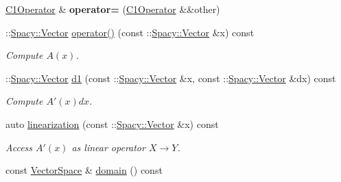 \begin{DoxyCompactItemize}
\item 
\hypertarget{classSpacy_1_1FEniCS_1_1C1Operator_ae611721c1f172413877c91a3e99ae69b}{}\hyperlink{classSpacy_1_1FEniCS_1_1C1Operator}{C1\+Operator} \& {\bfseries operator=} (\hyperlink{classSpacy_1_1FEniCS_1_1C1Operator}{C1\+Operator} \&\&other)\label{classSpacy_1_1FEniCS_1_1C1Operator_ae611721c1f172413877c91a3e99ae69b}

\item 
\hypertarget{classSpacy_1_1FEniCS_1_1C1Operator_a5e2b3831a7583793f6c134eedd2be9bc}{}\+::\hyperlink{classSpacy_1_1Vector}{Spacy\+::\+Vector} \hyperlink{classSpacy_1_1FEniCS_1_1C1Operator_a5e2b3831a7583793f6c134eedd2be9bc}{operator()} (const \+::\hyperlink{classSpacy_1_1Vector}{Spacy\+::\+Vector} \&x) const \label{classSpacy_1_1FEniCS_1_1C1Operator_a5e2b3831a7583793f6c134eedd2be9bc}

\begin{DoxyCompactList}\small\item\em Compute $A(x)$. \end{DoxyCompactList}\item 
\hypertarget{classSpacy_1_1FEniCS_1_1C1Operator_a610d7a4a5daec3b512ab3ccf46a7b9e9}{}\+::\hyperlink{classSpacy_1_1Vector}{Spacy\+::\+Vector} \hyperlink{classSpacy_1_1FEniCS_1_1C1Operator_a610d7a4a5daec3b512ab3ccf46a7b9e9}{d1} (const \+::\hyperlink{classSpacy_1_1Vector}{Spacy\+::\+Vector} \&x, const \+::\hyperlink{classSpacy_1_1Vector}{Spacy\+::\+Vector} \&dx) const \label{classSpacy_1_1FEniCS_1_1C1Operator_a610d7a4a5daec3b512ab3ccf46a7b9e9}

\begin{DoxyCompactList}\small\item\em Compute $A'(x)dx$. \end{DoxyCompactList}\item 
auto \hyperlink{classSpacy_1_1FEniCS_1_1C1Operator_aab603c2b35f2b710b2e646cf3fb7ee9c}{linearization} (const \+::\hyperlink{classSpacy_1_1Vector}{Spacy\+::\+Vector} \&x) const 
\begin{DoxyCompactList}\small\item\em Access $A'(x)$ as linear operator $X\rightarrow Y$. \end{DoxyCompactList}\item 
\hypertarget{classSpacy_1_1OperatorBase_a2588f9b3e0188820c4c494e63293dc6f}{}const \hyperlink{classSpacy_1_1VectorSpace}{Vector\+Space} \& \hyperlink{classSpacy_1_1OperatorBase_a2588f9b3e0188820c4c494e63293dc6f}{domain} () const \label{classSpacy_1_1OperatorBase_a2588f9b3e0188820c4c494e63293dc6f}


\end{DoxyCompactItemize}
